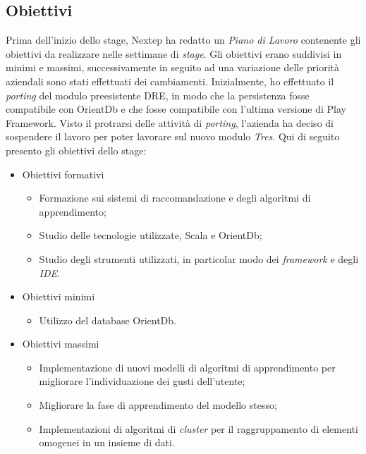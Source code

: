 \subsection{Obiettivi}
Prima dell'inizio dello stage, Nextep ha redatto un \emph{Piano di Lavoro} contenente gli obiettivi da realizzare nelle settimane di \emph{stage}. Gli obiettivi erano suddivisi in minimi e massimi, successivamente in seguito ad una variazione delle priorità aziendali sono stati effettuati dei cambiamenti. Inizialmente, ho effettuato il \emph{porting} del modulo preesistente DRE, in modo che la persistenza fosse compatibile con OrientDb e che fosse compatibile con l'ultima versione di Play Framework. Visto il protrarsi delle attività di \emph{porting}, l'azienda ha deciso di sospendere il lavoro per poter lavorare sul nuovo modulo \emph{Tres}.
\newpage
Qui di seguito presento gli obiettivi dello stage:
\begin{itemize}
\item Obiettivi formativi
\begin{itemize}
\item Formazione sui sistemi di raccomandazione e degli algoritmi di apprendimento;
\item Studio delle tecnologie utilizzate, Scala e OrientDb;
\item Studio degli strumenti utilizzati, in particolar modo dei \emph{framework} e degli \emph{IDE}.
\end{itemize}
\item Obiettivi minimi
\begin{itemize}
\item Utilizzo del database OrientDb.
\end{itemize}
\item Obiettivi massimi
\begin{itemize}
\item Implementazione di nuovi modelli di algoritmi di apprendimento per migliorare l'individuazione dei gusti dell'utente;
\item Migliorare la fase di apprendimento del modello stesso;
\item Implementazioni di algoritmi di \emph{cluster} per il raggruppamento di elementi omogenei in un insieme di dati.
\end{itemize}
\end{itemize}




